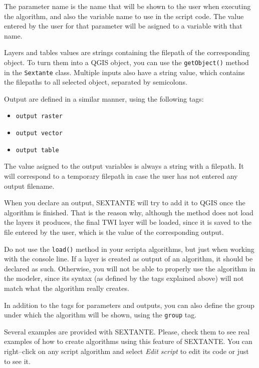 The parameter name is the name that will be shown to the user when executing the algorithm, and also the variable name to use in the script code. The value entered by the user for that parameter will be asigned to a variable with that name.

Layers and tables values are strings containing the filepath of the corresponding object. To turn them into a QGIS object, you can use the \texttt{getObject()} method in the \texttt{Sextante} class. Multiple inputs also have a string value, which contains the filepaths to all selected object, separated by semicolons.

Output are defined in a similar manner, using the following tags:

\begin{itemize}
	\item \texttt{output raster}
	\item \texttt{output vector}
	\item \texttt{output table}
\end{itemize}

The value asigned to the output variables is always a string with a filepath. It will correspond to a temporary filepath in case the user has not entered any output filename.

When you declare an output, SEXTANTE will try to add it to QGIS once the algorithm is finished. That is the reason why, although the  method does not load the layers it produces, the final TWI layer will be loaded, since it is saved to the file entered by the user, which is the value of the corresponding output.

Do not use the \texttt{load()} method in your scripta algorithms, but just when working with the console line. If a layer is created as output of an algorithm, it should be declared as such. Otherwise, you will not be able to properly use the algorithm in the modeler, since its syntax (as defined by the tags explained above) will not match what the algorithm really creates.

In addition to the tags for parameters and outputs, you can also define the group under which the algorithm will be shown, using the \texttt{group} tag.

Several examples are provided with SEXTANTE. Please, check them to see real examples of how to create algorithms using this feature of SEXTANTE. You can right--click 	on any script algorithm and select \emph{Edit script} to edit its code or just to see it.